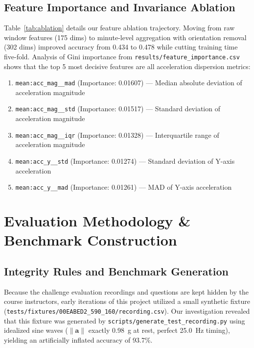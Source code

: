 \documentclass[11pt,a4paper]{article}
\begin{document}
\subsection{Feature Importance and Invariance Ablation}
Table~\ref{tab:ablation} details our feature ablation trajectory. Moving from raw window features (175 dims) to minute-level aggregation with orientation removal (302 dims) improved accuracy from 0.434 to 0.478 while cutting training time five-fold. Analysis of Gini importance from \texttt{results/feature\_importance.csv} shows that the top 5 most decisive features are all acceleration dispersion metrics:
\begin{enumerate}[noitemsep,topsep=1pt]
  \item \texttt{mean:acc\_mag\_\_mad} (Importance: 0.01607) --- Median absolute deviation of acceleration magnitude
  \item \texttt{mean:acc\_mag\_\_std} (Importance: 0.01517) --- Standard deviation of acceleration magnitude
  \item \texttt{mean:acc\_mag\_\_iqr} (Importance: 0.01328) --- Interquartile range of acceleration magnitude
  \item \texttt{mean:acc\_y\_\_std} (Importance: 0.01274) --- Standard deviation of Y-axis acceleration
  \item \texttt{mean:acc\_y\_\_mad} (Importance: 0.01261) --- MAD of Y-axis acceleration
\end{enumerate}

\section{Evaluation Methodology \& Benchmark Construction}
\label{sec:evaluation}

\subsection{Integrity Rules and Benchmark Generation}
Because the challenge evaluation recordings and questions are kept hidden by the course instructors, early iterations of this project utilized a small synthetic fixture (\nolinkurl{tests/fixtures/00EABED2_590_160/recording.csv}). Our investigation revealed that this fixture was generated by \texttt{scripts/generate\_test\_recording.py} using idealized sine waves ($\|\mathbf{a}\|$ exactly 0.98~g at rest, perfect 25.0~Hz timing), yielding an artificially inflated accuracy of 93.7\%.
\end{document}
